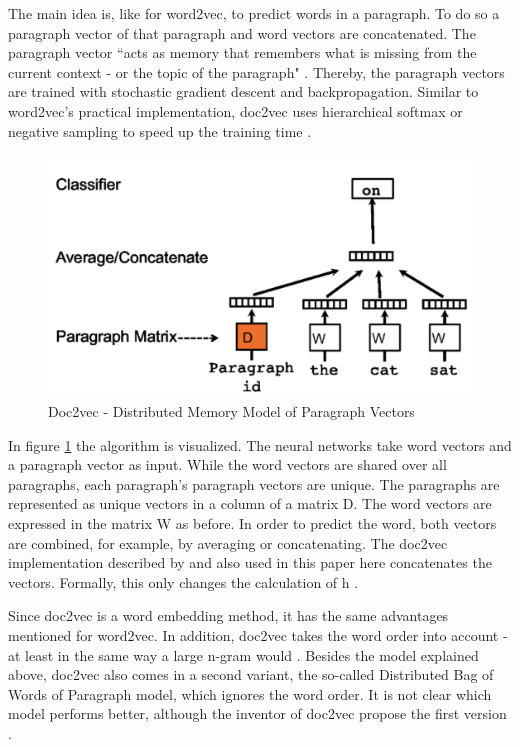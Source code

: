 \documentclass[12pt, a4paper, titlepage]{article}
\begin{document}
The main idea is, like for word2vec, to predict words in a paragraph. To do so a paragraph vector of that paragraph and word vectors are concatenated. The paragraph vector ``acts as memory that remembers what is missing from the current context - or the topic of the paragraph" \citep[3]{le2014}. Thereby, the paragraph vectors are trained with stochastic gradient descent and backpropagation. Similar to word2vec's practical implementation, doc2vec uses hierarchical softmax or negative sampling to speed up the training time \citep{lau2016}. 

\begin{figure}[]
  \center
  \includegraphics[scale=0.5]{doc2vec.png}
  \caption[Doc2vec - Distributed Memory Model of Paragraph Vectors]{\label{fig: F2} Doc2vec - Distributed Memory Model of Paragraph Vectors \citep[3]{le2014}}
\end{figure}

In figure \ref{fig: F2} the algorithm is visualized. The neural networks take word vectors and a paragraph vector as input. While the word vectors are shared over all paragraphs, each paragraph's paragraph vectors are unique. The paragraphs are represented as unique vectors in a column of a matrix D. The word vectors are expressed in the matrix W as before. In order to predict the word, both vectors are combined, for example, by averaging or concatenating. The doc2vec implementation described by \citet{le2014} and also used in this paper here concatenates the vectors. Formally, this only changes the calculation of h \citep{lau2016}. 

Since doc2vec is a word embedding method, it has the same advantages mentioned for word2vec. In addition, doc2vec takes the word order into account - at least in the same way a large n-gram would \citep{le2014}. Besides the model explained above, doc2vec also comes in a second variant, the so-called Distributed Bag of Words of Paragraph model, which ignores the word order. It is not clear which model performs better, although the inventor of doc2vec propose the first version \citep{lau2016}.
\end{document}
